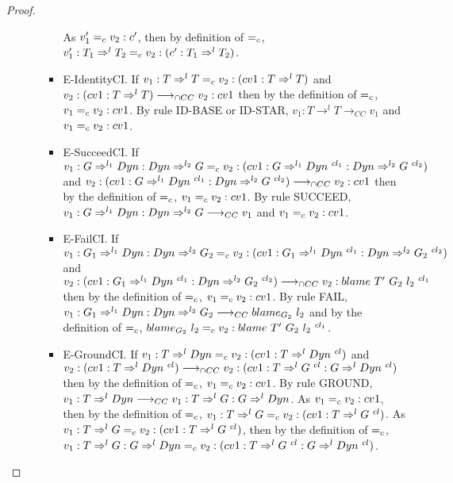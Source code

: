 \documentclass[a4paper]{article}
\begin{document}
\begin{proof}
\begin{itemize}
\begin{itemize}
\begin{itemize}
            As $v_1' =_c v_2 : c'$, then by definition of $=_c$, $v_1' : T_1 \Rightarrow^l T_2 =_c v_2 : (c' : T_1 \Rightarrow^l T_2)$.
            \item E-IdentityCI.
            If $v_1 : T \Rightarrow^l T =_c v_2 : (cv1 : T \Rightarrow^l T)$ and $v_2 : (cv1 : T \Rightarrow^l T) \longrightarrow_{\cap CC} v_2 : cv1$ then by the definition of $=_c$, $v_1 =_c v_2 : cv1$.
            By rule ID-BASE or ID-STAR, $v_1 : T \rightarrow^l T \longrightarrow_{CC} v_1$ and $v_1 =_c v_2 : cv1$.
            \item E-SucceedCI.
            If $v_1 : G \Rightarrow^{l_1} \Dyn : \Dyn \Rightarrow^{l_2} G \equalityCasts v_2 : (cv1 : G \Rightarrow^{l_1} \Dyn\ ^{cl_1} : \Dyn \Rightarrow^{l_2} G\ ^{cl_2})$ and $v_2 : (cv1 : G \Rightarrow^{l_1} Dyn\ ^{cl_1} : Dyn \Rightarrow^{l_2} G\ ^{cl_2}) \longrightarrow_{\cap CC} v_2 : cv1$ then by the definition of $=_c$, $v_1 =_c v_2 : cv1$.
            By rule SUCCEED, $v_1 : G \Rightarrow^{l_1} Dyn : Dyn \Rightarrow^{l_2} G \longrightarrow_{CC} v_1$ and $v_1 =_c v_2 : cv1$.
            \item E-FailCI.
            If $v_1 : G_1 \Rightarrow^{l_1} \Dyn : \Dyn \Rightarrow^{l_2} G_2 \equalityCasts v_2 : (cv1 : G_1 \Rightarrow^{l_1} \Dyn\ ^{cl_1} : \Dyn \Rightarrow^{l_2} G_2\ ^{cl_2})$ and $v_2 : (cv1 : G_1 \Rightarrow^{l_1} Dyn\ ^{cl_1} : Dyn \Rightarrow^{l_2} G_2\ ^{cl_2}) \longrightarrow_{\cap CC} v_2 : blame\ T'\ G_2\ l_2\ ^{cl_1}$ then by the definition of $=_c$, $v_1 =_c v_2 : cv1$.
            By rule FAIL, $v_1 : G_1 \Rightarrow^{l_1} Dyn : Dyn \Rightarrow^{l_2} G_2 \longrightarrow_{CC} blame_{G_2}\ l_2$ and by the definition of $=_c$, $blame_{G_2}\ l_2 =_c v_2 : blame\ T'\ G_2\ l_2\ ^{cl_1}$.
            \item E-GroundCI.
            If $v_1 : T \Rightarrow^l Dyn =_c v_2 : (cv1 : T \Rightarrow^l Dyn\ ^{cl})$ and $v_2 : (cv1 : T \Rightarrow^l \Dyn\ ^{cl}) \gios v_2 : (cv1 : T \Rightarrow^l G\ ^{cl} : G \Rightarrow^l \Dyn\ ^{cl})$ then by the definition of $=_c$, $v_1 =_c v_2 : cv1$.
            By rule GROUND, $v_1 : T \Rightarrow^l Dyn \longrightarrow_{CC} v_1 : T \Rightarrow^l G : G \Rightarrow^l Dyn$.
            As $v_1 =_c v_2 : cv1$, then by the definition of $=_c$, $v_1 : T \Rightarrow^l G \equalityCasts v_2 : (cv1 : T \Rightarrow^l G\ ^{cl})$.
            As $v_1 : T \Rightarrow^l G \equalityCasts v_2 : (cv1 : T \Rightarrow^l G\ ^{cl})$, then by the definition of $=_c$, $v_1 : T \Rightarrow^l G : G \Rightarrow^l Dyn =_c v_2 : (cv1 : T \Rightarrow^l G\ ^{cl} : G \Rightarrow^l Dyn\ ^{cl})$.

\end{itemize}
\end{itemize}
\end{itemize}
\end{proof}
\end{document}
